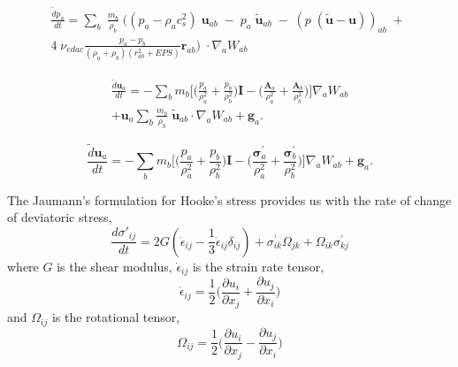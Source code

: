 \documentclass[preprint,12pt]{elsarticle}
\newcommand{\teng}[1]{\ensuremath{\boldsymbol{#1}}}
\newcommand{\ten}[1]{\ensuremath{\mathbf{#1}}}
\begin{document}
\begin{multline}
  \label{eq:sph-discretization-edac}
  \frac{\tilde{d}p_a}{dt} = \sum_{b} \; \frac{m_b}{\rho_{b}} \; \bigg(
  (p_{a} - \rho_{a} c_{s}^2) \; \ten{u}_{ab} \; - \;
  p_{a} \; \tilde{\ten{u}}_{ab} \; - \;
  (p \; (\tilde{\ten{u}} - \ten{u}))_{ab} \; + \; \\
  4 \; \nu_{edac}
  \frac{p_a - p_b}{(\rho_a + \rho_b) (r^2_{ab} + EPS)} \ten{r}_{ab}
  \bigg) \; \cdot \nabla_{a} W_{ab}
\end{multline}


\begin{multline}
  \label{eq:sph-momentum-fluid}
  \frac{\tilde{d}\ten{u}_{a}}{dt} = - \sum_{b} m_b \bigg[
  \bigg(\frac{p_a}{\rho_a^2} + \frac{p_b}{\rho_b^2}\bigg) \ten{I} -
  \bigg(\frac{\ten{A}_a}{\rho_a^2} + \frac{\ten{A}_b}{\rho_b^2}\bigg) \bigg]
  \nabla_{a} W_{ab} \\
  + \ten{u}_{a} \sum_{b} \frac{m_b}{\rho_{b}} \; \tilde{\ten{u}}_{ab} \cdot \nabla_{a} W_{ab} +
  \ten{g}_{a}.
\end{multline}


\begin{equation}
  \label{eq:sph-momentum-solid}
  \frac{\tilde{d}\ten{u}_{a}}{dt} = - \sum_{b} m_b \bigg[
  \bigg(\frac{p_a}{\rho_a^2} + \frac{p_b}{\rho_b^2}\bigg) \ten{I} -
  \bigg(\frac{\teng{\sigma}^{'}_{a}}{\rho_a^2} +
  \frac{\teng{\sigma}^{'}_{b}}{\rho_b^2}\bigg) \bigg]  \nabla_{a} W_{ab} +
  \ten{g}_{a}.
\end{equation}

The Jaumann's formulation for Hooke's stress provides us with the rate of
change of deviatoric stress,
\begin{equation}
  \label{eq:jaumann-stress-rate}
  \frac{d \sigma'_{ij}}{dt} = 2G (\dot{\epsilon}_{ij} - \frac{1}{3}
  \dot{\epsilon}_{ij} \delta_{ij}) + \sigma^{'}_{ik}  \Omega_{jk} +
  \Omega_{ik} \sigma^{'}_{kj}
\end{equation}
where $G$ is the shear modulus, $\dot{\epsilon}_{ij}$ is the strain rate tensor,
\begin{equation}
  \label{eq:strain-tensor}
  \dot{\epsilon}_{ij} = \frac{1}{2} \bigg(\frac{\partial u_i}{\partial x_j} +
  \frac{\partial u_j}{\partial x_i} \bigg)
\end{equation}
and $\Omega_{ij}$ is the rotational tensor,
\begin{equation}
  \label{eq:rotational-tensor}
  \Omega_{ij} = \frac{1}{2} \bigg(\frac{\partial u_i}{\partial x_j} -
  \frac{\partial u_j}{\partial x_i} \bigg)
\end{equation}
\end{document}

